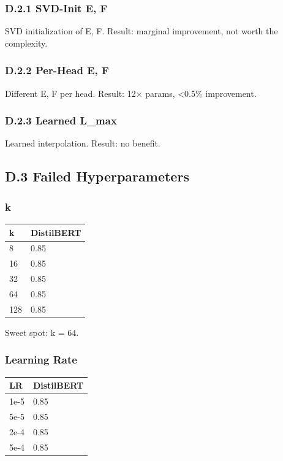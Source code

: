 \subsubsection{D.2.1 SVD-Init E, F}

SVD initialization of E, F. Result: marginal improvement, not worth the 
complexity.

\subsubsection{D.2.2 Per-Head E, F}

Different E, F per head. Result: 12$\times$ params, \textless{}0.5\% improvement.

\subsubsection{D.2.3 Learned L\_max}

Learned interpolation. Result: no benefit.

\subsection{D.3 Failed Hyperparameters}

\subsubsection{k}

\begin{table}[H]
\centering
\small
\begin{tabular}{ll}
\toprule
\textbf{k} & \textbf{DistilBERT} \\
\midrule
8 & 0.85 \\
16 & 0.85 \\
32 & 0.85 \\
64 & 0.85 \\
128 & 0.85 \\
\bottomrule
\end{tabular}
\end{table}

Sweet spot: k = 64.

\subsubsection{Learning Rate}

\begin{table}[H]
\centering
\small
\begin{tabular}{ll}
\toprule
\textbf{LR} & \textbf{DistilBERT} \\
\midrule
1e-5 & 0.85 \\
5e-5 & 0.85 \\
2e-4 & 0.85 \\
5e-4 & 0.85 \\
\bottomrule
\end{tabular}
\end{table}

